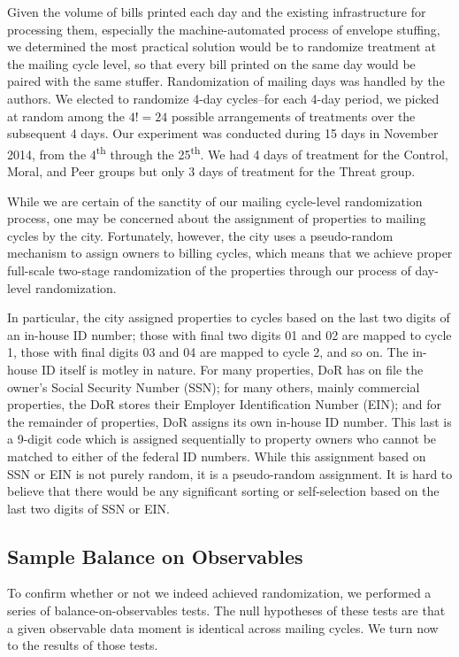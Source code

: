 \documentclass[12pt,titlepage]{article}
\begin{document}
Given the volume of bills printed each day and the existing
infrastructure for processing them, especially the machine-automated
process of envelope stuffing, we determined the most practical
solution would be to randomize treatment at the mailing cycle level,
so that every bill printed on the same day would be paired with the
same stuffer. Randomization of mailing days was handled by the
authors. We elected to randomize 4-day cycles--for each 4-day period,
we picked at random among the $4!=24$ possible arrangements of
treatments over the subsequent 4 days. Our experiment was conducted
during 15 days in November 2014, from the 4\textsuperscript{th}
through the 25\textsuperscript{th}. We had 4 days of treatment for the
Control, Moral, and Peer groups but only 3 days of treatment for the
Threat group.

While we are certain of the sanctity of our mailing cycle-level
randomization process, one may be concerned about the assignment of
properties to mailing cycles by the city. Fortunately, however, the city uses a
pseudo-random mechanism to assign owners to billing cycles, which means
that we achieve proper full-scale two-stage randomization of the
properties through our process of day-level randomization.

In particular, the city assigned properties to cycles based on the
last two digits of an in-house ID number; those with final two digits
01 and 02 are mapped to cycle 1, those with final digits 03 and 04 are
mapped to cycle 2, and so on. The in-house ID itself is motley in
nature. For many properties, DoR has on file the owner's Social
Security Number (SSN); for many others, mainly commercial properties,
the DoR stores their Employer Identification Number (EIN); and for the
remainder of properties, DoR assigns its own in-house ID number. This
last is a 9-digit code which is assigned sequentially to property
owners who cannot be matched to either of the federal ID
numbers. While this assignment based on SSN or EIN is not purely
random, it is a pseudo-random assignment. It is hard to believe
that there would be any significant sorting or self-selection based on
the last two digits of SSN or EIN.

\subsection{Sample Balance on Observables}

To confirm whether or not we indeed achieved randomization, we
performed a series of balance-on-observables tests. The null
hypotheses of these tests are that a given observable data moment is
identical across mailing cycles. We turn now to the results of those
tests.
\end{document}
